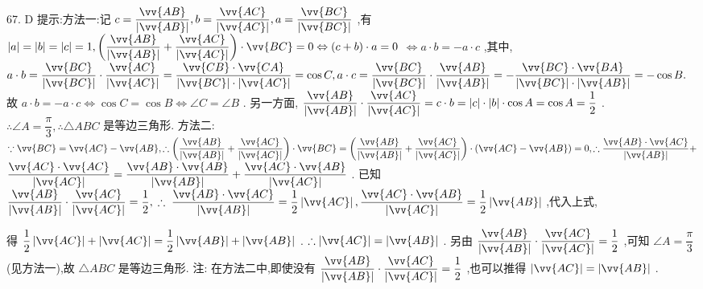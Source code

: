 67. D 提示:方法一:记 $c = \dfrac{\vv{AB}}{\left| \vv{AB}\right| },b = \dfrac{\vv{AC}}{\left| \vv{AC}\right| },a = \dfrac{\vv{BC}}{\left| \vv{BC}\right| }$ ,有 $\left| a\right|  = \left| b\right|  = \left| c\right|  = 1,\left( {\dfrac{\vv{AB}}{\left| \vv{AB}\right| } + \dfrac{\vv{AC}}{\left| \vv{AC}\right| }}\right)  \cdot  \vv{BC} = 0 \Leftrightarrow  \left( {c + b}\right)  \cdot  a = 0$  $\Leftrightarrow  a \cdot  b =  - a \cdot  c$ ,其中, $a \cdot  b = \dfrac{\vv{BC}}{\left| \vv{BC}\right| } \cdot  \dfrac{\vv{AC}}{\left| \vv{AC}\right| } = \dfrac{\vv{CB} \cdot  \vv{CA}}{\left| \vv{BC}\right|  \cdot  \left| \vv{AC}\right| } = \cos C,a \cdot  c = \dfrac{\vv{BC}}{\left| \vv{BC}\right| } \cdot  \dfrac{\vv{AB}}{\left| \vv{AB}\right| } =  - \dfrac{\vv{BC} \cdot  \vv{BA}}{\left| \vv{BC}\right|  \cdot  \left| \vv{AB}\right| } =  - \cos B.$ 故 $a \cdot  b =  - a \cdot  c \Leftrightarrow  \cos C = \cos B \Leftrightarrow  \angle C = \angle B$ . 另一方面, $\dfrac{\vv{AB}}{\left| \vv{AB}\right| } \cdot  \dfrac{\vv{AC}}{\left| \vv{AC}\right| } = c \cdot  b = \left| c\right|  \cdot  \left| b\right|  \cdot  \cos A = \cos A = \dfrac{1}{2}$ . $\therefore \angle A = \dfrac{\pi }{3},\therefore \bigtriangleup {ABC}$ 是等边三角形. 方法二: $\because \vv{BC} = \vv{AC} - \vv{AB},\therefore \left( {\dfrac{\vv{AB}}{\left| \vv{AB}\right| } + \dfrac{\vv{AC}}{\left| \vv{AC}\right| }}\right)  \cdot  \vv{BC} = \left( {\dfrac{\vv{AB}}{\left| \vv{AB}\right| } + \dfrac{\vv{AC}}{\left| \vv{AC}\right| }}\right)  \cdot  \left( {\vv{AC} - \vv{AB}}\right)  = 0,\therefore \dfrac{\vv{AB} \cdot  \vv{AC}}{\left| \vv{AB}\right| } +$  $\dfrac{\vv{AC} \cdot  \vv{AC}}{\left| \vv{AC}\right| } = \dfrac{\vv{AB} \cdot  \vv{AB}}{\left| \vv{AB}\right| } + \dfrac{\vv{AC} \cdot  \vv{AB}}{\left| \vv{AC}\right| }$ . 已知 $\dfrac{\vv{AB}}{\left| \vv{AB}\right| } \cdot  \dfrac{\vv{AC}}{\left| \vv{AC}\right| } = \dfrac{1}{2},\;\therefore \;\dfrac{\vv{AB} \cdot  \vv{AC}}{\left| \vv{AB}\right| } = \dfrac{1}{2}\left| \vv{AC}\right| ,\dfrac{\vv{AC} \cdot  \vv{AB}}{\left| \vv{AC}\right| } = \dfrac{1}{2}\left| \vv{AB}\right|$ ,代入上式,

得 $\dfrac{1}{2}\left| \vv{AC}\right|  + \left| \vv{AC}\right|  = \dfrac{1}{2}\left| \vv{AB}\right|  + \left| \vv{AB}\right|$ . $\therefore \left| \vv{AC}\right|  = \left| \vv{AB}\right|$ . 另由 $\dfrac{\vv{AB}}{\left| \vv{AB}\right| } \cdot  \dfrac{\vv{AC}}{\left| \vv{AC}\right| } = \dfrac{1}{2}$ ,可知 $\angle A = \dfrac{\pi }{3}$ (见方法一),故 $\bigtriangleup {ABC}$ 是等边三角形. 注: 在方法二中,即使没有 $\dfrac{\vv{AB}}{\left| \vv{AB}\right| } \cdot  \dfrac{\vv{AC}}{\left| \vv{AC}\right| } = \dfrac{1}{2}$ ,也可以推得 $\left| \vv{AC}\right|  = \left| \vv{AB}\right|$ .

